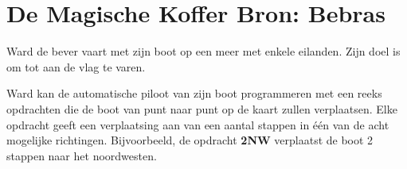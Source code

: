 \documentclass[12pt, a4paper]{article}
\begin{document}
	\begin{minipage}{\textwidth}
		\section{De Magische Koffer \hfill\small Bron: Bebras}
			
			Ward de bever vaart met zijn boot op een meer met enkele eilanden. Zijn doel is om tot aan de vlag te varen.
			
			Ward kan de automatische piloot van zijn boot programmeren met een reeks opdrachten die de boot van punt naar punt op de kaart zullen verplaatsen. Elke opdracht geeft een verplaatsing aan van een aantal stappen in één van de acht mogelijke richtingen. Bijvoorbeeld, de opdracht \textbf{2NW} verplaatst de boot 2 stappen naar het noordwesten.
			

\end{minipage}
\end{document}
